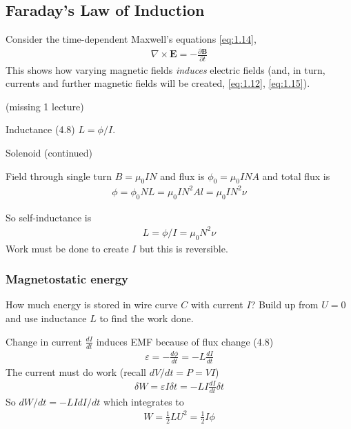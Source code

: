 \documentclass[a4paper]{article}
\begin{document}
\subsection{Faraday's Law of Induction}
Consider the time-dependent Maxwell's equations \eqref{eq:1.14},
\begin{equation*}\tag{4.1} \label{eq:4.1}
\begin{aligned}
\nabla \times \mathbf{E} = -\frac{\partial \mathbf{B}}{\partial t}
\end{aligned}
\end{equation*}
This shows how varying magnetic fields \emph{induces} electric fields (and, in turn, currents and further magnetic fields will be created, \eqref{eq:1.12}, \eqref{eq:1.15}).

(missing 1 lecture)

Inductance (4.8) $L=\phi/I$.

Solenoid (continued)

Field through single turn $B=\mu_0 IN$ and flux is $\phi_0 = \mu_0 INA$ and total flux is
\begin{equation*}
\begin{aligned}
\phi = \phi_0 NL = \mu_0 IN^2 Al = \mu_0 IN^2\nu
\end{aligned}
\end{equation*}

So self-inductance is
\begin{equation*}\tag{4.9} \label{eq:4.9}
\begin{aligned}
L=\phi/I = \mu_0 N^2 \nu
\end{aligned}
\end{equation*}
Work must be done to create $I$ but this is reversible.

\subsubsection{Magnetostatic energy}
How much energy is stored in wire curve $C$ with current $I$? Build up from $U=0$ and use inductance $L$ to find the work done.

Change in current $\frac{dI}{dt}$ induces EMF because of flux change (4.8)
\begin{equation*}\tag{4.10} \label{eq:4.10}
\begin{aligned}
\varepsilon = -\frac{d\phi}{dt} = -L \frac{dI}{dt}
\end{aligned}
\end{equation*}
The current must do work (recall $dV/dt = P=VI$)
\begin{equation*}
\begin{aligned}
\delta W = \varepsilon I \delta t = -LI \frac{dI}{dt} \delta t
\end{aligned}
\end{equation*}
So $dW/dt = -LI dI/dt$ which integrates to
\begin{equation*}\tag{4.11} \label{eq:4.11}
\begin{aligned}
W = \frac{1}{2} LU^2 = \frac{1}{2}I\phi
\end{aligned}
\end{equation*}
\end{document}
